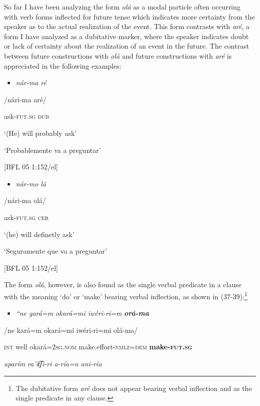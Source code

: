 So far I have been analyzing the form \textit{olá} as a modal particle often occurring with verb forms inflected for future tense which indicates more certainty from the speaker as to the actual realization of the event. This form contrasts with \textit{aré}, a form I have analyzed as a dubitative marker, where the speaker indicates doubt or lack of certainty about the realization of an event in the future. The contrast between future constructions with \textit{olá} and future constructions with \textit{aré} is appreciated in the following examples:

\begin{itemize}
\item \textit{nár-ma   ré}
\end{itemize}

/nári-ma        aré/        

ask-\textsc{fut.sg   dub}

  ‘(He) will probably ask’

  ‘Probablemente va a preguntar’      

[BFL 05 1:152/el]

\begin{itemize}
\item \textit{nár-mo   l}\textit{á}
\end{itemize}

/nári-ma  olá/         

ask-\textsc{fut.sg  cer}      

‘(he) will definetly ask’

‘Seguramente que va a preguntar’      

[BFL 05 1:152/el]

The form \textit{olá}, however, is also found as the single verbal predicate in a clause with the meaning ‘do’ or ‘make’ bearing verbal inflection, as shown in (37-39):\footnote{The dubitative form \textit{aré} does not appear bearing verbal inflection and as the single predicate in any clause.}

\begin{itemize}
\item \textit{“ne   gará=m   okará=mi     iwéri-ri=m} \textbf{\textit{orá-ma}} 
\end{itemize}

/ne  kará=m  okará=mi    iwéri-ri=mi      olá-ma/ 

  \textsc{int}  well    okará=2\textsc{sg.nom}  make.effort-\textsc{nmlz}=\textsc{dem}  \textbf{make-\textsc{fut.sg} }

\textit{aparím}   \textit{ra’ít͡ʃi-ri   a-ría=n    ani-ría} 

